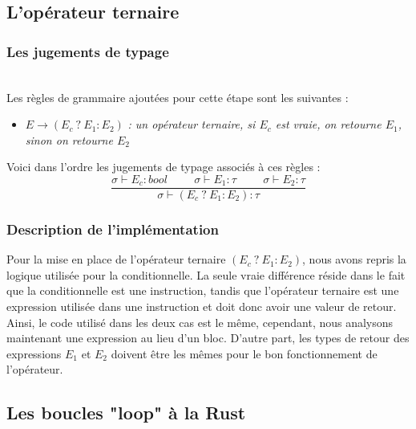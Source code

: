 \documentclass{article}
\begin{document}
\vspace{2.5cm}
\subsection{L'opérateur ternaire}
\subsubsection{Les jugements de typage}
\ \\
Les règles de grammaire ajoutées pour cette étape sont les suivantes :

\begin{itemize}[label=\textbullet, font=\LARGE \color{black},leftmargin=1cm]
    \item $E \xrightarrow{} (E_c\ ?\ E_1:E_2)$ \textit{: un opérateur ternaire, si $E_c$ est vraie, on retourne $E_1$, sinon on retourne $E_2$}
\end{itemize}
\hbox{}
Voici dans l'ordre les jugements de typage associés à ces règles :\hbox{}
\begin{equation}
\frac {
    \sigma\vdash E_c:bool       \hspace{1cm}
    \sigma\vdash E_1:\tau       \hspace{1cm}
    \sigma\vdash E_2:\tau
}
{\sigma\vdash(E_c\ ?\ E_1:E_2):\tau}
\end{equation}

\subsubsection{Description de l'implémentation}
Pour la mise en place de l'opérateur ternaire \textit{$(E_c\ ?\ E_1 : E_2)$}, nous avons repris la logique utilisée pour la conditionnelle. La seule vraie différence réside dans le fait que la conditionnelle est une instruction, tandis que l'opérateur ternaire est une expression utilisée dans une instruction et doit donc avoir une valeur de retour. Ainsi, le code utilisé dans les deux cas est le même, cependant, nous analysons maintenant une expression au lieu d'un bloc. D'autre part, les types de retour des expressions $E_1$ et $E_2$ doivent être les mêmes pour le bon fonctionnement de l'opérateur. 







\newpage
\subsection{Les boucles "loop" à la Rust}
\end{document}
